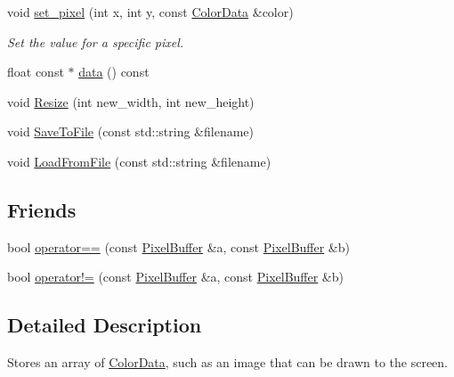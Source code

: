 \begin{DoxyCompactItemize}
\mbox{\label{classimage__tools_1_1PixelBuffer_ac3559133504c49f3af9a00544411c3b8}} 
void \hyperlink{classimage__tools_1_1PixelBuffer_ac3559133504c49f3af9a00544411c3b8}{set\+\_\+pixel} (int x, int y, const \hyperlink{classimage__tools_1_1ColorData}{Color\+Data} \&color)
\begin{DoxyCompactList}\small\item\em Set the value for a specific pixel. \end{DoxyCompactList}\item 
float const  $\ast$ \hyperlink{classimage__tools_1_1PixelBuffer_a8f7b9f293b7ac93f8c33f75f50ce5a7b}{data} () const
\item 
void \hyperlink{classimage__tools_1_1PixelBuffer_a001dbd44de2d3f19b04180cdbc897b97}{Resize} (int new\+\_\+width, int new\+\_\+height)
\item 
void \hyperlink{classimage__tools_1_1PixelBuffer_ae3f65414f52d3df79c89c88d2a4db288}{Save\+To\+File} (const std\+::string \&filename)
\item 
void \hyperlink{classimage__tools_1_1PixelBuffer_aaa5f861df2ec901617aadeb5016bdf1e}{Load\+From\+File} (const std\+::string \&filename)
\end{DoxyCompactItemize}
\subsection*{Friends}
\begin{DoxyCompactItemize}
\item 
bool \hyperlink{classimage__tools_1_1PixelBuffer_a68aef4100a6c7062d102b566dc382543}{operator==} (const \hyperlink{classimage__tools_1_1PixelBuffer}{Pixel\+Buffer} \&a, const \hyperlink{classimage__tools_1_1PixelBuffer}{Pixel\+Buffer} \&b)
\item 
bool \hyperlink{classimage__tools_1_1PixelBuffer_a9751369b6acaba6bc42143cc2b7314ea}{operator!=} (const \hyperlink{classimage__tools_1_1PixelBuffer}{Pixel\+Buffer} \&a, const \hyperlink{classimage__tools_1_1PixelBuffer}{Pixel\+Buffer} \&b)
\end{DoxyCompactItemize}


\subsection{Detailed Description}
Stores an array of \hyperlink{classimage__tools_1_1ColorData}{Color\+Data}, such as an image that can be drawn to the screen. 

